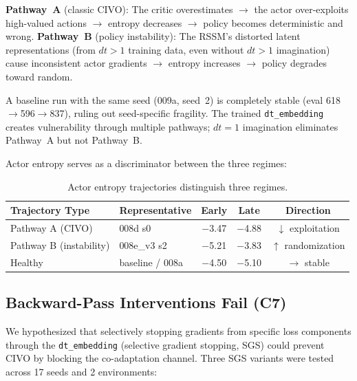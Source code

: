 \documentclass[10pt,letterpaper]{article}
\begin{document}
\textbf{Pathway~A} (classic CIVO): The critic overestimates $\to$ the actor over-exploits high-valued actions $\to$ entropy decreases $\to$ policy becomes deterministic and wrong.
\textbf{Pathway~B} (policy instability): The RSSM's distorted latent representations (from $dt>1$ training data, even without $dt>1$ imagination) cause inconsistent actor gradients $\to$ entropy increases $\to$ policy degrades toward random.

A baseline run with the same seed (009a, seed~2) is completely stable (eval 618$\to$596$\to$837), ruling out seed-specific fragility.
The trained \texttt{dt\_embedding} creates vulnerability through multiple pathways; $dt=1$ imagination eliminates Pathway~A but not Pathway~B.

Actor entropy serves as a discriminator between the three regimes:

\begin{table}[h]
\centering
\caption{Actor entropy trajectories distinguish three regimes.}
\label{tab:entropy}
\small
\begin{tabular}{@{}llccc@{}}
\toprule
Trajectory Type & Representative & Early & Late & Direction \\
\midrule
Pathway A (CIVO)       & 008d s0           & $-$3.47 & $-$4.88 & $\downarrow$ exploitation \\
Pathway B (instability) & 008e\_v3 s2      & $-$5.21 & $-$3.83 & $\uparrow$ randomization \\
Healthy                 & baseline / 008a   & $-$4.50 & $-$5.10 & $\to$ stable \\
\bottomrule
\end{tabular}
\end{table}

\subsection{Backward-Pass Interventions Fail (C7)}
\label{sec:c7}

We hypothesized that selectively stopping gradients from specific loss components through the \texttt{dt\_embedding} (selective gradient stopping, SGS) could prevent CIVO by blocking the co-adaptation channel.
Three SGS variants were tested across 17 seeds and 2 environments:
\end{document}

